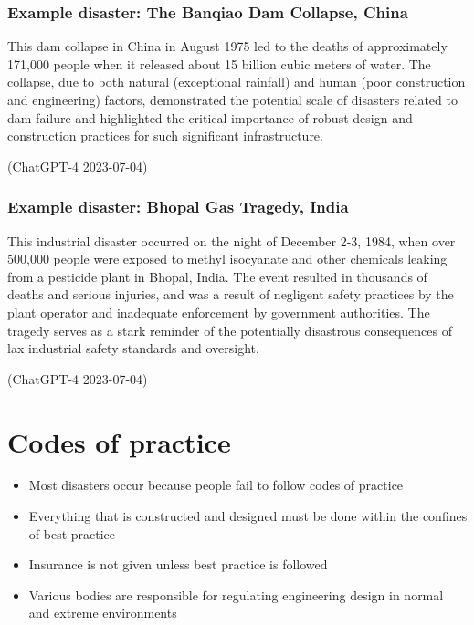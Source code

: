 \subsubsection{Example disaster: The Banqiao Dam Collapse, China}
\begin{quoting}
    This dam collapse in China in August 1975 led to the deaths of approximately 171,000 people when it released about 15 billion cubic meters of water. The collapse, due to both natural (exceptional rainfall) and human (poor construction and engineering) factors, demonstrated the potential scale of disasters related to dam failure and highlighted the critical importance of robust design and construction practices for such significant infrastructure.

    (ChatGPT-4 2023-07-04)
\end{quoting}
\subsubsection{Example disaster: Bhopal Gas Tragedy, India}
\begin{quoting}
    This industrial disaster occurred on the night of December 2-3, 1984, when over 500,000 people were exposed to methyl isocyanate and other chemicals leaking from a pesticide plant in Bhopal, India. The event resulted in thousands of deaths and serious injuries, and was a result of negligent safety practices by the plant operator and inadequate enforcement by government authorities. The tragedy serves as a stark reminder of the potentially disastrous consequences of lax industrial safety standards and oversight.

    (ChatGPT-4 2023-07-04)
\end{quoting}
\section{Codes of practice}
\begin{itemize}
    \item Most disasters occur because people fail to follow codes of practice
    \item Everything that is constructed and designed must be done within the confines of best practice
    \item Insurance is not given unless best practice is followed
    \item Various bodies are responsible for regulating engineering design in normal and extreme environments
\end{itemize}
